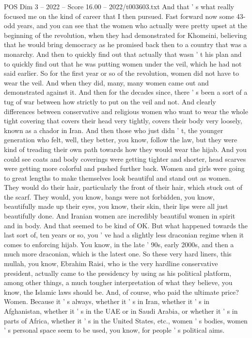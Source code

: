 \begin{textsample}{POS Dim 3 – 2022 – Score 16.00 – 2022/t003603.txt}
And that ' s what really focused me on the kind of career that I then pursued.
Fast forward now some 43-odd years, and you can see that the women who actually were pretty upset at the beginning of the revolution, when they had demonstrated for Khomeini, believing that he would bring democracy as he promised back then to a country that was a monarchy.
And then to quickly find out that actually that wasn ' t his plan and to quickly find out that he was putting women under the veil, which he had not said earlier.
So for the first year or so of the revolution, women did not have to wear the veil.
And when they did, many, many women came out and demonstrated against it.
And then for the decades since, there ' s been a sort of a tug of war between how strictly to put on the veil and not.
And clearly differences between conservative and religious women who want to wear the whole tight covering that covers their head very tightly, covers their body very loosely, known as a chador in Iran.
And then those who just didn ' t, the younger generation who felt, well, they better, you know, follow the law, but they were kind of treading their own path towards how they would wear the hijab.
And you could see coats and body coverings were getting tighter and shorter, head scarves were getting more colorful and pushed further back.
Women and girls were going to great lengths to make themselves look beautiful and stand out as women.
They would do their hair, particularly the front of their hair, which stuck out of the scarf.
They would, you know, bangs were not forbidden, you know, beautifully made up their eyes, you know, their skin, their lips were all just beautifully done.
And Iranian women are incredibly beautiful women in spirit and in body.
And that seemed to be kind of OK.
But what happened towards the last sort of, ten years or so, you ' ve had a slightly less draconian regime when it comes to enforcing hijab.
You know, in the late ' 90s, early 2000s, and then a much more draconian, which is the latest one.
So these very hard liners, this mullah, you know, Ebrahim Raisi, who is the very hardline conservative president, actually came to the presidency by using as his political platform, among other things, a much tougher interpretation of what they believe, you know, the Islamic laws should be.
And, of course, who paid the ultimate price?
Women.
Because it ' s always, whether it ' s in Iran, whether it ' s in Afghanistan, whether it ' s in the UAE or in Saudi Arabia, or whether it ' s in parts of Africa, whether it ' s in the United States, etc., women ' s bodies, women ' s personal space seem to be used, you know, for people ' s political aims.

\end{textsample}
